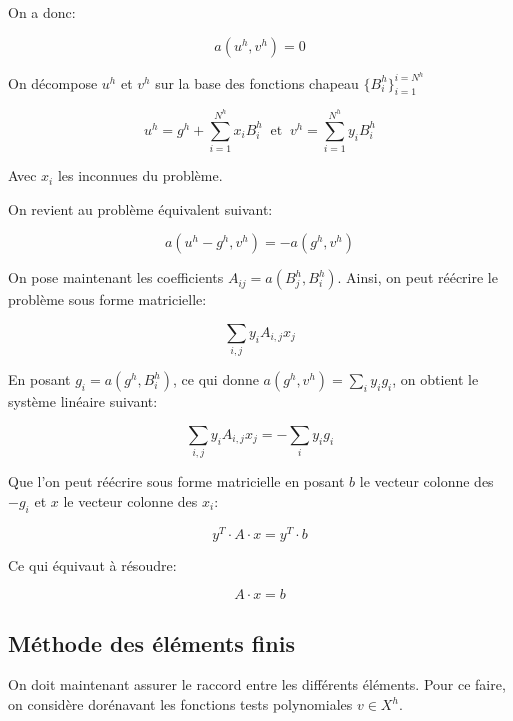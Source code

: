 \documentclass{article}
\begin{document}
On a donc:

\begin{equation}
    a(u^h, v^h) = 0
\end{equation}

On décompose $u^h$ et $v^h$ sur la base des fonctions chapeau
$\{B^h_i\}^{i=N^h}_{i=1}$

\begin{equation}
    u^h = g^h + \sum_{i=1}^{N^h} x_i B^h_i
    \ \text{ et } \ v^h = \sum_{i=1}^{N^h} y_i B^h_i
\end{equation}

Avec $x_i$ les inconnues du problème.

On revient au problème équivalent suivant:

\begin{equation}
    a(u^h - g^h, v^h) = - a(g^h, v^h)
\end{equation}

On pose maintenant les coefficients $A_{ij} = a(B^h_j, B^h_i)$. Ainsi, on peut
réécrire le problème sous forme matricielle:

\begin{equation}
    \sum_{i,j} y_i A_{i,j} x_j
\end{equation}

En posant $g_i = a(g^h, B^h_i)$, ce qui donne $a(g^h, v^h) = \sum_i y_i g_i$,
on obtient le système linéaire suivant:

\begin{equation}
    \sum_{i,j} y_i A_{i,j} x_j = - \sum_i y_i g_i
\end{equation}

Que l'on peut réécrire sous forme matricielle en posant $b$ le vecteur colonne
des $-g_i$ et $x$ le vecteur colonne des $x_i$:

\begin{equation}
    y^T \cdot A \cdot x =  y^T \cdot b
\end{equation}

Ce qui équivaut à résoudre:

\begin{equation}
    A \cdot x = b
\end{equation}

\subsection{Méthode des éléments finis}

On doit maintenant assurer le raccord entre les différents éléments.
Pour ce faire, on considère dorénavant les fonctions tests
polynomiales $v \in X^h$.
\end{document}
